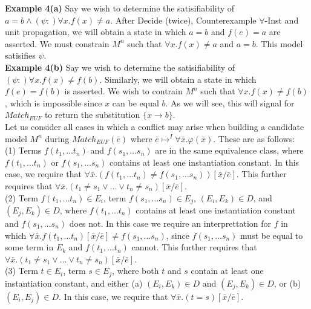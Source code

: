 \documentclass{llncs}
\begin{document}
{\bf Example 4(a)}
Say we wish to determine the satisifiability of $a = b \wedge (\psi:) \forall x. f( x ) \neq a$.
After Decide (twice), Counterexample $\forall$-Inst and unit propagation, we will obtain a state in which $a = b$ and $f( e ) = a$ are asserted.
We must constrain $M^n$ such that $\forall x. f( x ) \neq a$ and $a = b$.
This model satisifies $\psi$. \\

{\bf Example 4(b)}
Say we wish to determine the satisifiability of $(\psi:) \forall x. f( x ) \neq f( b )$.
Similarly, we will obtain a state in which $f( e ) = f( b )$ is asserted.
We wish to contrain $M^n$ such that $\forall x. f( x ) \neq f( b )$, which is impossible since $x$ can be equal $b$.
As we will see, this will signal for $Match_{EUF}$ to return the substitution $\{ x \rightarrow b \}$. \\

Let us consider all cases in which a conflict may arise when building a candidate model $M^n$ during $Match_{EUF}( \bar{e} )$ where $\bar{e} \mapsto^I \forall \bar{x}. \varphi( \bar{x} )$.
These are as follows: \\

(1) Terms $f( t_1, \ldots t_n )$ and $f( s_1, \ldots s_n )$ are in the same equivalence class, where $f( t_1, \ldots t_n )$ or $f( s_1, \ldots s_n )$ contains at least one instantiation constant.  In this case, we require that $\forall \bar{x}. (f( t_1, \ldots t_n ) \neq f( s_1, \ldots s_n ))[\bar{x}/\bar{e}]$. 
This further requires that $\forall \bar{x}. (t_1 \neq s_1 \vee \ldots \vee t_n \neq s_n)[\bar{x}/\bar{e}]$. \\

(2) Term $f( t_1, \ldots t_n ) \in E_i$, term $f( s_1, \ldots s_n ) \in E_j$, $( E_i, E_k ) \in D$, and $( E_j, E_k ) \in D$, where $f( t_1, \ldots t_n )$ contains at least one instantiation constant and $f( s_1, \ldots s_n )$ does not.
In this case we require an interprettation for $f$ in which $\forall \bar{x}. f( t_1, \ldots t_n )[\bar{x}/\bar{e}] \neq f( s_1, \ldots s_n )$, since $f( s_1, \ldots s_n )$ must be equal to some term in $E_k$ and $f( t_1, \ldots t_n )$ cannot.
This further requires that $\forall \bar{x}. (t_1 \neq s_1 \vee \ldots \vee t_n \neq s_n)[\bar{x}/\bar{e}]$. \\

(3) Term $t \in E_i$, term $s \in E_j$, where both $t$ and $s$ contain at least one instantiation constant, and either (a) $( E_i, E_k ) \in D$ and $( E_j, E_k ) \in D$, or (b) $( E_i, E_j ) \in D$.
In this case, we require that $\forall \bar{x}. (t = s)[\bar{x}/\bar{e}]$. \\
\end{document}
